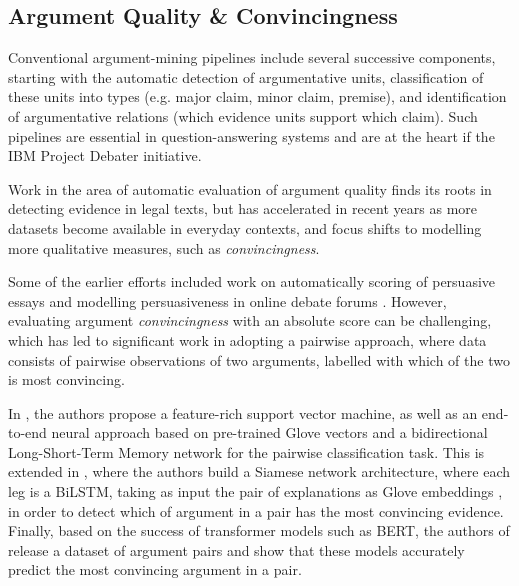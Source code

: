 \documentclass[runningheads]{llncs}
\begin{document}
\subsection{Argument Quality \& Convincingness}
Conventional argument-mining pipelines include several successive components, 
starting with the automatic detection of argumentative units, classification of 
these units into types (e.g. major claim, minor claim, premise), and 
identification of argumentative relations (which evidence units support which 
claim). Such pipelines are essential in question-answering systems 
\cite{lippi_argumentation_2016} and are at the heart if the IBM Project Debater 
initiative. 

Work in the area of automatic evaluation of argument quality finds its roots in 
 detecting evidence in legal texts\cite{moens_automatic_2007}, but has 
 accelerated in recent years as more datasets become 
available in everyday contexts, and focus shifts to modelling more qualitative 
measures, such as \textit{convincingness}. 

Some of the earlier efforts included work on automatically 
scoring of persuasive essays \cite{persing_end--end_2016} and modelling 
persuasiveness in online debate forums \cite{tan_winning_2016}. However, 
evaluating argument \textit{convincingness} with an absolute score can be 
challenging, which has led to significant work in adopting a pairwise approach, 
where data consists of pairwise observations of two arguments, labelled with 
which of the two is most convincing.


	
	
	
	

In \cite{habernal_which_2016}, the authors propose a feature-rich support 
vector machine, as well as an end-to-end neural approach based on pre-trained 
Glove vectors and a bidirectional Long-Short-Term Memory network for the 
pairwise classification task. This is extended in \cite{gleize_are_2019}, where 
the authors build a Siamese network architecture, where each leg is a BiLSTM, 
taking as input the pair of explanations as Glove embeddings 
\cite{pennington_glove:_2014}, in order to detect which of argument in a pair 
has the most convincing evidence. Finally, based on the success of transformer 
models such as BERT\cite{devlin_bert_2018}, the authors of 
\cite{toledo_automatic_2019} 
release a dataset of argument pairs and show that these models accurately 
predict the most convincing argument in a pair.
\end{document}
